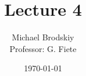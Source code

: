 


\title{Lecture 4}
\date{\today}
\author{Michael Brodskiy\\ \small Professor: G. Fiete}



\maketitle

